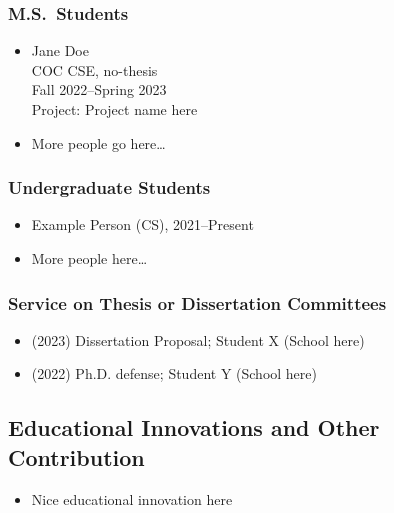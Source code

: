 \begin{adjustwidth}{2em}{0pt}
\subsubsection{M.S.\ Students}

\begin{itemize}
    \item Jane Doe \\
        COC CSE, no-thesis \\
        Fall 2022--Spring 2023 \\
        Project: Project name here
    \item More people go here\dots
\end{itemize}

\subsubsection{Undergraduate Students}

\begin{itemize}
    \item Example Person (CS), 2021--Present
    \item More people here\dots
\end{itemize}

\subsubsection{Service on Thesis or Dissertation Committees}

\begin{itemize}
    \item (2023) Dissertation Proposal; Student X (School here)
    \item (2022) Ph.D. defense; Student Y (School here)
\end{itemize}

\subsection{Educational Innovations and Other Contribution}


\begin{itemize}
    \item Nice educational innovation here
\end{itemize}


\end{adjustwidth}
